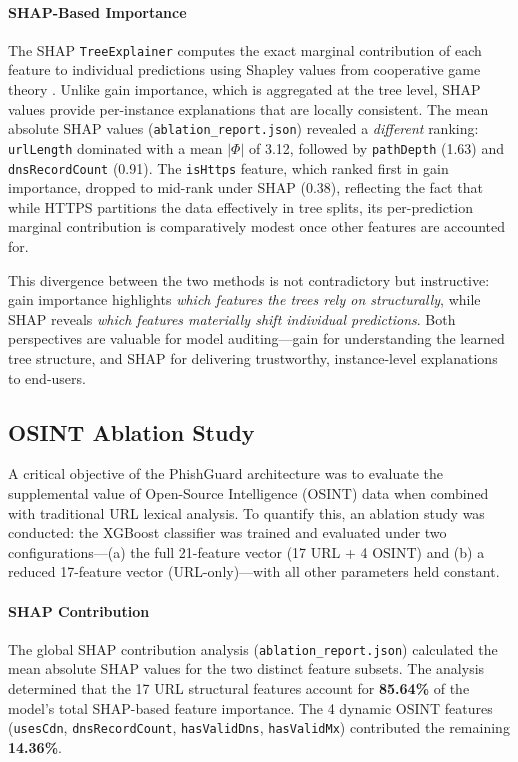\paragraph{SHAP-Based Importance}

The SHAP \texttt{TreeExplainer} computes the exact marginal contribution
of each feature to individual predictions using Shapley values from
cooperative game theory \cite{lundberg2017}. Unlike gain importance,
which is aggregated at the tree level, SHAP values provide per-instance
explanations that are locally consistent. The mean absolute SHAP values
(\texttt{ablation\_report.json}) revealed a \emph{different} ranking:
\texttt{urlLength} dominated with a mean $|\Phi|$ of 3.12, followed by
\texttt{pathDepth} (1.63) and \texttt{dnsRecordCount} (0.91). The
\texttt{isHttps} feature, which ranked first in gain importance, dropped
to mid-rank under SHAP (0.38), reflecting the fact that while HTTPS
partitions the data effectively in tree splits, its per-prediction
marginal contribution is comparatively modest once other features are
accounted for.

This divergence between the two methods is not contradictory but
instructive: gain importance highlights \emph{which features the trees
rely on structurally}, while SHAP reveals \emph{which features
materially shift individual predictions}. Both perspectives are valuable
for model auditing---gain for understanding the learned tree structure,
and SHAP for delivering trustworthy, instance-level explanations to
end-users.

\subsection{OSINT Ablation Study}\label{osint-ablation-study}

A critical objective of the PhishGuard architecture was to evaluate the
supplemental value of Open-Source Intelligence (OSINT) data when
combined with traditional URL lexical analysis. To quantify this, an
ablation study was conducted: the XGBoost classifier was trained and
evaluated under two configurations---(a) the full 21-feature vector (17
URL + 4 OSINT) and (b) a reduced 17-feature vector (URL-only)---with all
other parameters held constant.

\paragraph{SHAP Contribution}

The global SHAP contribution analysis (\texttt{ablation\_report.json})
calculated the mean absolute SHAP values for the two distinct feature
subsets. The analysis determined that the 17 URL structural features
account for \textbf{85.64\%} of the model's total SHAP-based feature
importance. The 4 dynamic OSINT features
(\texttt{usesCdn}, \texttt{dnsRecordCount},
\texttt{hasValidDns}, \texttt{hasValidMx}) contributed the remaining
\textbf{14.36\%}.

